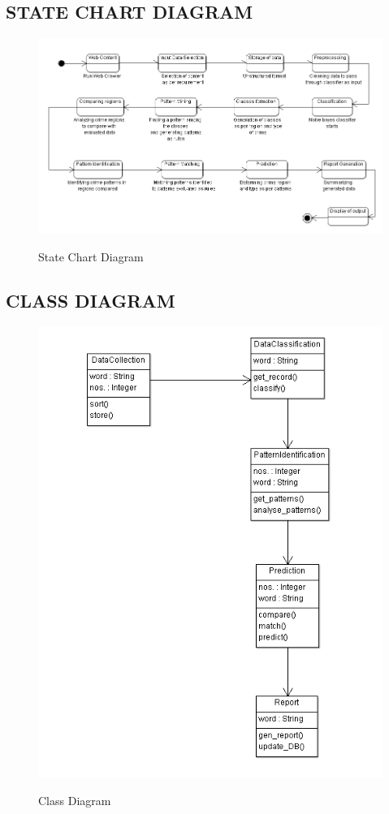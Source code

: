     \subsection*{STATE CHART DIAGRAM}
    
    \begin{figure}[H]
  \centering
  \includegraphics[scale=0.7]{STATECHARTCRIME.png}\\
  \caption{State Chart Diagram}
  
\end{figure}
\pagebreak
    \subsection*{CLASS DIAGRAM}
    \begin{figure}[H]
    \centering
  \includegraphics[scale=0.75]{CLASS.png}\\
  \caption{Class Diagram}
  
\end{figure}

